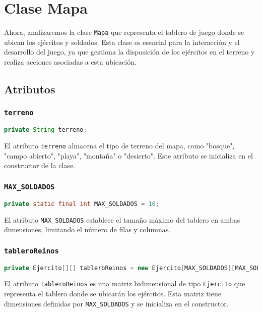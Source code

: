 \section{Clase Mapa}

Ahora, analizaremos la clase \texttt{Mapa} que representa el tablero de juego donde se ubican los ejércitos y soldados. Esta clase es esencial para la interacción y el desarrollo del juego, ya que gestiona la disposición de los ejércitos en el terreno y realiza acciones asociadas a esta ubicación.

\subsection{Atributos}

\subsubsection{\texttt{terreno}}
\begin{lstlisting}[language=Java]
private String terreno;
\end{lstlisting}
El atributo \texttt{terreno} almacena el tipo de terreno del mapa, como "bosque", "campo abierto", "playa", "montaña" o "desierto". Este atributo se inicializa en el constructor de la clase.

\subsubsection{\texttt{MAX\_SOLDADOS}}
\begin{lstlisting}[language=Java]
private static final int MAX_SOLDADOS = 10;
\end{lstlisting}
El atributo \texttt{MAX\_SOLDADOS} establece el tamaño máximo del tablero en ambas dimensiones, limitando el número de filas y columnas.

\subsubsection{\texttt{tableroReinos}}
\begin{lstlisting}[language=Java]
private Ejercito[][] tableroReinos = new Ejercito[MAX_SOLDADOS][MAX_SOLDADOS];
\end{lstlisting}
El atributo \texttt{tableroReinos} es una matriz bidimensional de tipo \texttt{Ejercito} que representa el tablero donde se ubicarán los ejércitos. Esta matriz tiene dimensiones definidas por \texttt{MAX\_SOLDADOS} y se inicializa en el constructor.

